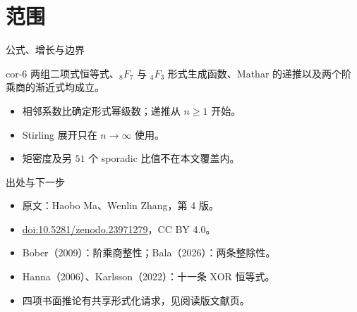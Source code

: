 \documentclass{beamer}
\begin{document}
\section{范围}
\begin{frame}{公式、增长与边界}
\begin{bookresult}{cor-6}
两组二项式恒等式、${}_8F_7$ 与 ${}_4F_3$ 形式生成函数、Mathar 的递推以及两个阶乘商的渐近式均成立。
\end{bookresult}
\begin{itemize}
\item 相邻系数比确定形式幂级数；递推从 $n\geq1$ 开始。
\item Stirling 展开只在 $n\to\infty$ 使用。
\item 矩密度及另 $51$ 个 sporadic 比值不在本文覆盖内。
\end{itemize}
\end{frame}
\begin{frame}{出处与下一步}
\begin{itemize}
\item 原文：Haobo Ma、Wenlin Zhang，第 4 版。
\item \href{https://doi.org/10.5281/zenodo.23971279}{doi:10.5281/zenodo.23971279}，CC BY 4.0。
\item Bober（2009）：阶乘商整性；Bala（2026）：两条整除性。
\item Hanna（2006）、Karlsson（2022）：十一条 XOR 恒等式。
\item 四项书面推论有共享形式化请求，见阅读版文献页。
\end{itemize}
\end{frame}
\appendix
\FormalVerification
\end{document}
